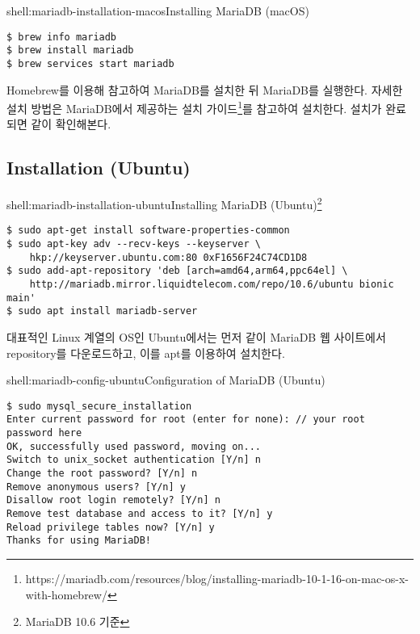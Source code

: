 \begin{shellenv}{shell:mariadb-installation-macos}{Installing MariaDB (macOS)}\begin{verbatim}
$ brew info mariadb
$ brew install mariadb
$ brew services start mariadb
\end{verbatim}
\end{shellenv}

Homebrew를 이용해 \를 참고하여 MariaDB를 설치한 뒤 MariaDB를 실행한다. 자세한 설치 방법은 MariaDB에서 제공하는 설치 가이드\footnote{https://mariadb.com/resources/blog/installing-mariadb-10-1-16-on-mac-os-x-with-homebrew/}를 참고하여 설치한다. 설치가 완료되면 \와 같이 확인해본다.

\subsection*{Installation (Ubuntu)}

\begin{shellenv}{shell:mariadb-installation-ubuntu}{Installing MariaDB (Ubuntu)\footnote{MariaDB 10.6 기준}}\begin{verbatim}
$ sudo apt-get install software-properties-common
$ sudo apt-key adv --recv-keys --keyserver \
    hkp://keyserver.ubuntu.com:80 0xF1656F24C74CD1D8
$ sudo add-apt-repository 'deb [arch=amd64,arm64,ppc64el] \
    http://mariadb.mirror.liquidtelecom.com/repo/10.6/ubuntu bionic main'
$ sudo apt install mariadb-server
\end{verbatim}
\end{shellenv}

대표적인 Linux 계열의 OS인 Ubuntu에서는 먼저 \와 같이 MariaDB 웹 사이트에서 repository를 다운로드하고, 이를 apt를 이용하여 설치한다.

\begin{shellenv}{shell:mariadb-config-ubuntu}{Configuration of MariaDB (Ubuntu)}\begin{verbatim}
$ sudo mysql_secure_installation
Enter current password for root (enter for none): // your root password here
OK, successfully used password, moving on...
Switch to unix_socket authentication [Y/n] n
Change the root password? [Y/n] n
Remove anonymous users? [Y/n] y
Disallow root login remotely? [Y/n] n
Remove test database and access to it? [Y/n] y
Reload privilege tables now? [Y/n] y
Thanks for using MariaDB!
\end{verbatim}
\end{shellenv}

